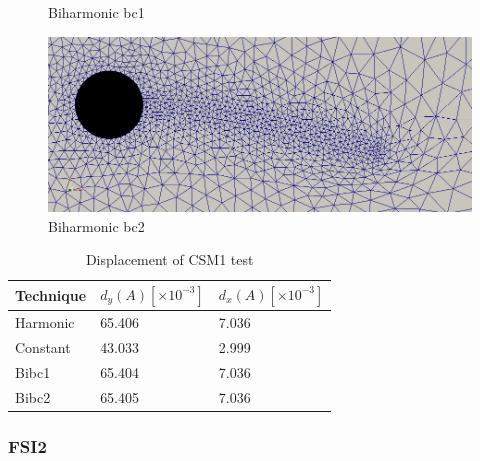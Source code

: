 \begin{figure}[H]
\begin{minipage}[b]{0.5\linewidth}
    \caption{Biharmonic bc1} 
    \vspace{4ex}
  \end{minipage}%
  \begin{minipage}[b]{0.5\linewidth}
    \centering
    \includegraphics[scale=0.2]{./Verification_Validation/Mesh_motion_results/CSM1_bibc2.png} 
    \caption{Biharmonic bc2} 
    \vspace{4ex}
  \end{minipage} 
\end{figure}

\begin{table}[H]
\centering
\caption{Displacement of CSM1 test}
\label{my-label}
\begin{tabular}{|l|l|l|}
\hline
Technique & $d_y(A) [\times 10^{-3}]$ & $d_x(A) [\times 10^{-3}]$ \\ \hline
Harmonic & 65.406 & 7.036 \\ \hline
Constant & 43.033 & 2.999 \\ \hline
Bibc1 & 65.404 & 7.036 \\ \hline
Bibc2 & 65.405 & 7.036 \\ \hline
\end{tabular}
\end{table}


\subsubsection{FSI2}

